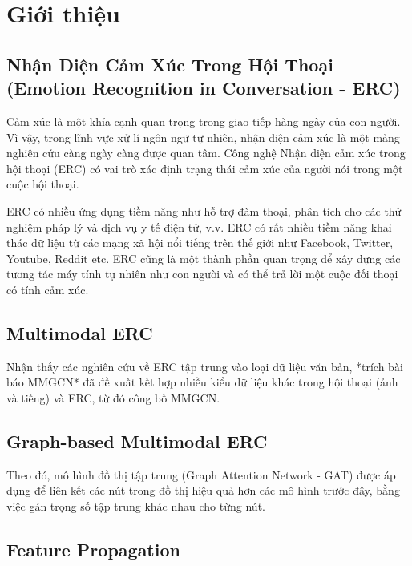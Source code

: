 \chapter{Giới thiệu}
\label{chap:Giới thiệu}



\section{Nhận Diện Cảm Xúc Trong Hội Thoại (Emotion Recognition in Conversation - ERC)}
\label{sec:Nhận Diện Cảm Xúc Trong Hội Thoại (Emotion Recognition in Conversation - ERC)}

Cảm xúc là một khía cạnh quan trọng trong giao tiếp hàng ngày của con người. 
Vì vậy, trong lĩnh vực xử lí ngôn ngữ tự nhiên, nhận diện cảm xúc là một mảng nghiên cứu càng ngày càng được quan tâm. 
Công nghệ Nhận diện cảm xúc trong hội thoại (ERC) có vai trò xác định trạng thái cảm xúc của người nói trong một cuộc hội thoại. 

ERC có nhiều ứng dụng tiềm năng như hỗ trợ đàm thoại, phân tích cho các thử nghiệm pháp lý và dịch vụ y tế điện tử, v.v.
ERC có rất nhiều tiềm năng khai thác dữ liệu từ các mạng xã hội nổi tiếng trên thế giới như Facebook, Twitter, Youtube, Reddit etc. 
ERC cũng là một thành phần quan trọng để xây dựng các tương tác máy tính tự nhiên như con người và có thể trả lời một cuộc đối thoại có tính cảm xúc.


\section{Multimodal ERC}
\label{sec:Multimodal ERC}

Nhận thấy các nghiên cứu về ERC tập trung vào loại dữ liệu văn bản, *trích bài báo MMGCN* đã đề xuất kết hợp nhiều kiểu dữ liệu khác trong hội thoại (ảnh và tiếng) và ERC, từ đó công bố MMGCN. 

\section{Graph-based Multimodal ERC}
\label{chap:Graph-based Multimodal ERC}

Theo đó, mô hình đồ thị tập trung (Graph Attention Network - GAT) được áp dụng để liên kết các nút trong đồ thị hiệu quả hơn các mô hình trước đây, bằng việc gán trọng số tập trung khác nhau cho từng nút. 

\section{Feature Propagation}
\label{sec:Feature Propagation}

